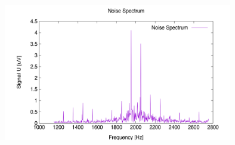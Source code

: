 \documentclass{article}
\begin{document}
    \begin{figure}[H]
        \centering
        \includegraphics[width=10cm]{../Bilddateien/Messung1_Noise_Spectrum.png}
    \end{figure}

    
\end{document}
